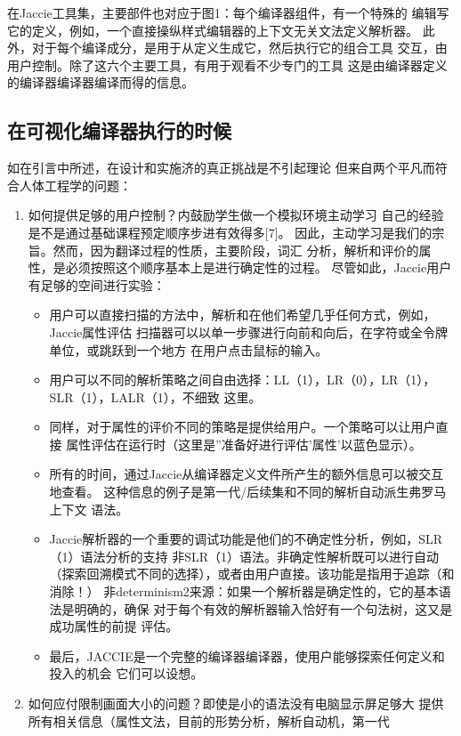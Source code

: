 在Jaccie工具集，主要部件也对应于图1：每个编译器组件，有一个特殊的
编辑写它的定义，例如，一个直接操纵样式编辑器的上下文无关文法定义解析器。
此外，对于每个编译成分，是用于从定义生成它，然后执行它的组合工具
交互，由用户控制。除了这六个主要工具，有用于观看不少专门的工具
这是由编译器定义的编译器编译器编译而得的信息。

\subsection{在可视化编译器执行的时候}

如在引言中所述，在设计和实施济的真正挑战是不引起理论
但来自两个平凡而符合人体工程学的问题：
\begin{enumerate}
	\item 如何提供足够的用户控制？内鼓励学生做一个模拟环境主动学习
	自己的经验是不是通过基础课程预定顺序步进有效得多[7]。
	因此，主动学习是我们的宗旨。然而，因为翻译过程的性质，主要阶段，词汇
	分析，解析和评价的属性，是必须按照这个顺序基本上是进行确定性的过程。
	尽管如此，Jaccie用户有足够的空间进行实验：
	\begin{itemize}
		\item 用户可以直接扫描的方法中，解析和在他们希望几乎任何方式，例如，Jaccie属性评估
		扫描器可以以单一步骤进行向前和向后，在字符或全令牌单位，或跳跃到一个地方
		在用户点击鼠标的输入。
		\item
		用户可以不同的解析策略之间自由选择：LL（1），LR（0），LR（1），SLR（1），LALR（1），不细致
		这里。
		\item 同样，对于属性的评价不同的策略是提供给用户。一个策略可以让用户直接
		属性评估在运行时（这里是''准备好进行评估'属性'以蓝色显示）。
		\item 所有的时间，通过Jaccie从编译器定义文件所产生的额外信息可以被交互地查看。
		这种信息的例子是第一代/后续集和不同的解析自动派生弗罗马上下文
		语法。
		\item Jaccie解析器的一个重要的调试功能是他们的不确定性分析，例如，SLR（1）语法分析的支持
		非SLR（1）语法。非确定性解析既可以进行自动（探索回溯模式不同的选择），或者由用户直接。该功能是指用于追踪（和消除！）
		非determinism2来源：如果一个解析器是确定性的，它的基本语法是明确的，确保
		对于每个有效的解析器输入恰好有一个句法树，这又是成功属性的前提
		评估。
		\item 最后，JACCIE是一个完整的编译器编译器，使用户能够探索任何定义和投入的机会
		它们可以设想。
	\end{itemize}
	\item 如何应付限制画面大小的问题？即使是小的语法没有电脑显示屏足够大
	提供所有相关信息（属性文法，目前的形势分析，解析自动机，第一代

\end{enumerate}
